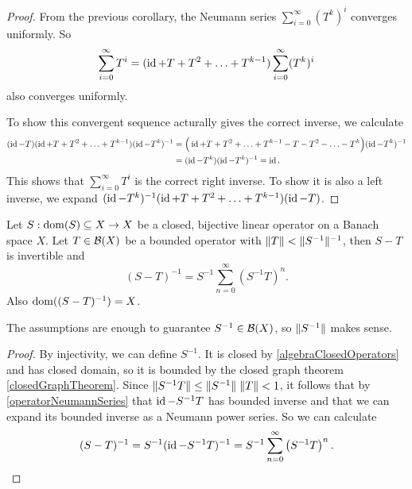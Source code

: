 \begin{proof}
From the previous corollary, the Neumann series $\sum_{i=0}^\infty(T^k)^i$ converges uniformly. So
\[ \sum_{i=0}^\infty T^i = (\operatorname{id} + T + T^2 +\ldots + T^{k-1})\sum_{i=0}^\infty(T^k)^i \]
also converges uniformly.

To show this convergent sequence acturally gives the correct inverse, we calculate
\begin{align*}
(\operatorname{id}-T)(\operatorname{id} + T + T^2 +\ldots + T^{k-1})(\operatorname{id} - T^k)^{-1} &= \Big(\operatorname{id} + T + T^2 +\ldots + T^{k-1} - T - T^2 -\ldots - T^{k}\Big)(\operatorname{id} - T^k)^{-1} \\
&= (\operatorname{id} - T^k)(\operatorname{id} - T^k)^{-1} = \operatorname{id}.
\end{align*}
This shows that $\sum_{i=0}^\infty T^i$ is the correct right inverse. To show it is also a left inverse, we expand $(\operatorname{id} - T^k)^{-1}(\operatorname{id} + T + T^2 +\ldots + T^{k-1})(\operatorname{id}-T)$.
\end{proof}

\begin{proposition}
Let $S: \operatorname{dom}(S)\subseteq X\to X$ be a closed, bijective linear operator on a Banach space $X$. Let $T\in\operatorname{\mathcal{B}}(X)$ be a bounded operator with $\lVert T\rVert < \lVert S^{-1}\rVert^{-1}$, then $S-T$ is invertible and
\[ (S-T)^{-1} = S^{-1}\sum_{n=0}^\infty \left(S^{-1}T\right)^n. \]
Also $\operatorname{dom}((S-T)^{-1}) = X$.
\end{proposition}
The assumptions are enough to guarantee $S^{-1}\in \operatorname{\mathcal{B}}(X)$, so $\lVert S^{-1}\rVert$ makes sense.
\begin{proof}
By injectivity, we can define $S^{-1}$. It is closed by \ref{algebraClosedOperators} and has closed domain, so it is bounded by the closed graph theorem \ref{closedGraphTheorem}. Since $\lVert S^{-1}T\rVert \leq \lVert S^{-1}\rVert\;\lVert T\rVert < 1$, it follows that by \ref{operatorNeumannSeries} that $\operatorname{id} - S^{-1}T$  has bounded inverse and that we can expand its bounded inverse as a Neumann power series. So we can calculate
\[ (S-T)^{-1} = S^{-1}(\operatorname{id} - S^{-1}T)^{-1} = S^{-1}\sum_{n=0}^\infty \left(S^{-1}T\right)^n. \]
\end{proof}


